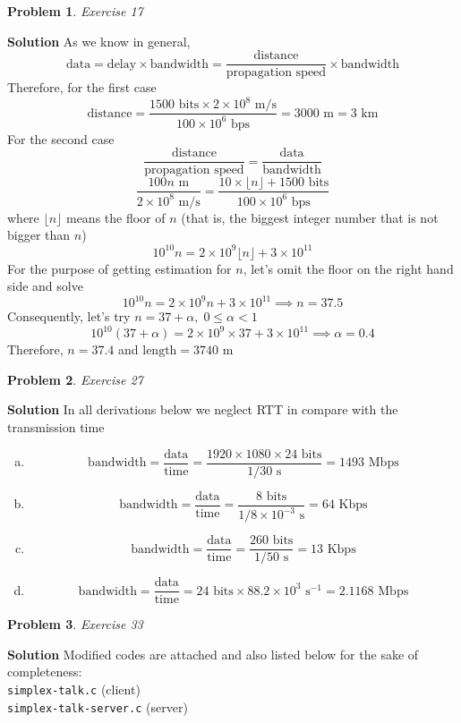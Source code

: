 \documentclass[11pt]{article} %
\newtheorem{prob}{Problem}
\newenvironment{solution}%
{\par\textbf{Solution}\space }%
{\par}
\begin{document}
\begin{prob}
	Exercise 17
\end{prob}
\begin{solution}
	As we know in general, \[\text{data}=\text{delay}\times\text{bandwidth}=\frac{\text{distance}}{\text{propagation speed}}\times
	\text{bandwidth}\]
	Therefore, for the first case \[\text{distance}=\frac{1500\text{ bits}\times2\times10^8\text{ m/s}}{100\times10^6\text{ bps}}=
	3000\text{ m}=3\text{ km}\]
	For the second case \[\frac{\text{distance}}{\text{propagation speed}}=\frac{\text{data}}{\text{bandwidth}}\]
	\[\frac{100n\text{ m}}{2\times{10^8}\text{ m/s}}=\frac{10\times \lfloor n \rfloor+1500\text{ bits}}{100\times10^6\text{ bps}}\]
	where $\lfloor n \rfloor$ means the floor of $n$ (that is, the biggest integer number that is not bigger than $n$)
	\[ 10^{10} n=2\times10^9\lfloor n\rfloor + 3\times 10^{11}\]
	For the purpose of getting estimation for $n$, let's omit the floor on the right hand side and solve
	\[ 10^{10} n=2\times10^9 n + 3\times 10^{11}\implies n=37.5\]
	Consequently, let's try $n=37+\alpha,\;0\leq\alpha<1$
	\[ 10^{10} (37+\alpha)=2\times10^9 \times37 + 3\times 10^{11} \implies \alpha=0.4\]
	Therefore, $n=37.4$ and $\text{length}=3740\text{ m}$
\end{solution}
\begin{prob}Exercise 27\end{prob}
\begin{solution}
	In all derivations below we neglect RTT in compare with the transmission time
	\begin{enumerate}[(a)]
		\item{\[\text{bandwidth}=\frac{\text{data}}{\text{time}}=\frac{1920\times1080\times24\text{ bits}}{1/30\text{ s}}=
			1493\text{ Mbps}\]}
		\item{\[\text{bandwidth}=\frac{\text{data}}{\text{time}}=\frac{8\text{ bits}}{1/8\times10^{-3}\text{ s}}=64\text{ Kbps}\]
			}
		\item{\[\text{bandwidth}=\frac{\text{data}}{\text{time}}=\frac{260\text{ bits}}{1/50\text{ s}}=13\text{ Kbps}\]
			}
		\item{\[\text{bandwidth}=\frac{\text{data}}{\text{time}}=24\text{ bits}\times88.2\times 10^3\text{ s}^{-1}=2.1168\text{ Mbps}\]
			}
	\end{enumerate}
\end{solution}
\begin{prob}Exercise 33\end{prob}
	\begin{solution}
		Modified codes are attached and also listed below for the sake of completeness:\\
		\texttt{simplex-talk.c} (client)\\
		
		\texttt{simplex-talk-server.c} (server)\\
		
	\end{solution}
\end{document}
